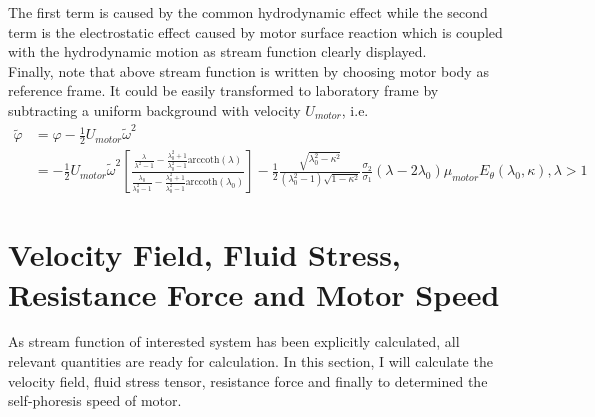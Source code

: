 \documentclass[fontsize=11pt, %
                             paper=a4, %
                             twoside, %
                             captions=tableheading,
                             index=totoc,
                             hyperref]{labbook}
\begin{document}
\begin{addmargin}[4cm]{0cm}
\begin{equation}
\end{equation}
The first term is caused by the common hydrodynamic effect while the second term is the electrostatic effect caused by motor surface reaction which is coupled with the hydrodynamic motion as stream function clearly displayed.\\
Finally, note that above stream function is written by choosing motor body as reference frame. It could be easily transformed to laboratory frame by subtracting a uniform background with velocity $U_{motor}$, i.e.
\begin{equation}\label{eqn-streamfunc}
\begin{aligned}
\tilde\varphi&=\varphi-\frac{1}{2}U_{motor}\tilde{\omega}^2\\
&=-\frac{1}{2}U_{motor}\tilde{\omega}^2\left[\frac{\frac{\lambda}{\lambda^2-1}-\frac{\lambda_0^2+1}{\lambda_0^2-1}\mathrm{arccoth}(\lambda)}{\frac{\lambda_0}{\lambda_0^2-1}-\frac{\lambda_0^2+1}{\lambda_0^2-1}\mathrm{arccoth}(\lambda_0)}\right]-\frac{1}{2}\frac{\sqrt{\lambda_0^2-\kappa^2}}{(\lambda_0^2-1)\sqrt{1-\kappa^2}}\frac{\sigma_2}{\sigma_1}(\lambda-2\lambda_0)\mu_{motor}E_\theta(\lambda_0,\kappa), \lambda>1
\end{aligned}
\end{equation}
\section{Velocity Field, Fluid Stress, Resistance Force and Motor Speed}
As stream function of interested system has been explicitly calculated, all relevant quantities are ready for calculation. In this section, I will calculate the velocity field, fluid stress tensor, resistance force and finally to determined the self-phoresis speed of motor.

\end{addmargin}
\end{document}
